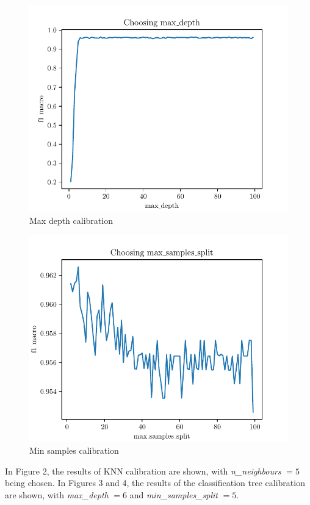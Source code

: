 \documentclass[conference]{IEEEtran}
\begin{document}
\begin{figure}
    \centering
    \includegraphics[scale=0.8]{depth.pdf}
    \caption{Max depth calibration}
\end{figure}

\begin{figure}
    \centering
    \includegraphics[scale=0.8]{samples.pdf}
    \caption{Min samples calibration}
\end{figure}

In Figure 2, the results of KNN calibration are shown, with \emph{n\_neighbours} $= 5$ being chosen. In Figures 3 and 4, the results of the classification tree calibration are shown, with \emph{max\_depth} $=6$ and
\emph{min\_samples\_split} $=5$.
\end{document}
